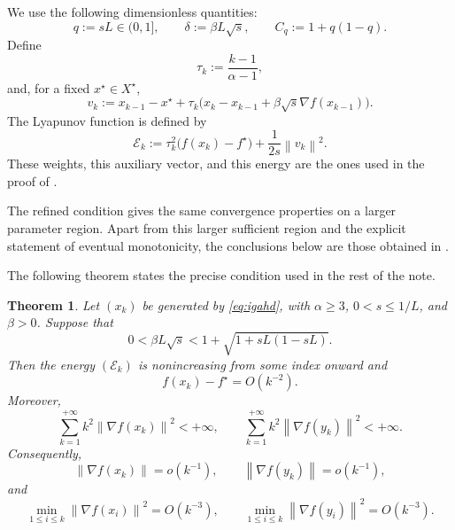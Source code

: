 \documentclass[11pt]{article}
\theoremstyle{plain}
\newtheorem{theorem}{Theorem}[section]
\theoremstyle{definition}
\newcommand{\norm}[1]{\left\lVert #1\right\rVert}
\begin{document}
We use the following dimensionless quantities:
\begin{equation}
\label{eq:dimensionless}
q:=sL\in(0,1],
\qquad
\delta:=\beta L\sqrt{s},
\qquad
C_q:=1+q(1-q).
\end{equation}
Define
\begin{equation}
\label{eq:tau}
\tau_k:=\frac{k-1}{\alpha-1},
\end{equation}
and, for a fixed $x^\star\in X^\star$,
\begin{equation}
\label{eq:vk}
v_k:=x_{k-1}-x^\star
+\tau_k\bigl(x_k-x_{k-1}+\beta\sqrt{s}\nabla f(x_{k-1})\bigr).
\end{equation}
The Lyapunov function is defined by
\begin{equation}
\label{eq:energy}
\mathcal E_k
:=\tau_k^2\bigl(f(x_k)-f^\star\bigr)+\frac{1}{2s}\norm{v_k}^2.
\end{equation}
These weights, this auxiliary vector, and this energy are the ones used in the proof of \cite[Theorem~6]{AFCR2022}.

The refined condition gives the same convergence properties on a larger parameter region. Apart from this larger sufficient region and the explicit
statement of eventual monotonicity, the conclusions below are those obtained in \cite[Theorem~6 and Remark~4]{AFCR2022}.

The following theorem states the precise condition used in the rest of the note.

\begin{theorem}
\label{thm:main}
Let $(x_k)$ be generated by \eqref{eq:igahd}, with $\alpha\geq3$, $0<s\leq1/L$, and $\beta>0$. Suppose that
\begin{equation}
\label{eq:main-condition}
0<\beta L\sqrt{s}<1+\sqrt{1+sL(1-sL)}.
\end{equation}
Then the energy $(\mathcal E_k)$ is nonincreasing from some index onward and
\begin{equation}
\label{eq:objective-rate}
f(x_k)-f^\star=O(k^{-2}).
\end{equation}
Moreover,
\begin{equation}
\label{eq:gradient-summability}
\sum_{k=1}^{+\infty}k^2\norm{\nabla f(x_k)}^2<+\infty,
\qquad
\sum_{k=1}^{+\infty}k^2\norm{\nabla f(y_k)}^2<+\infty.
\end{equation}
Consequently,
\begin{equation}
\label{eq:gradient-little-o}
\norm{\nabla f(x_k)}=o(k^{-1}),
\qquad
\norm{\nabla f(y_k)}=o(k^{-1}),
\end{equation}
and
\begin{equation}
\label{eq:best-iterate}
\min_{1\leq i\leq k}\norm{\nabla f(x_i)}^2=O(k^{-3}),
\qquad
\min_{1\leq i\leq k}\norm{\nabla f(y_i)}^2=O(k^{-3}).
\end{equation}
\end{theorem}
\end{document}
